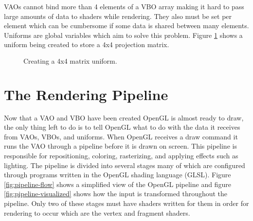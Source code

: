\documentclass{article}
\begin{document}
VAOs cannot bind more than 4 elements of a VBO array making it hard to pass large amounts of data to shaders while rendering. They also must be set per element which can be cumbersome if some data is shared between many elements. Uniforms are global variables which aim to solve this problem. Figure \ref{fig:matrix-uniform} shows a uniform being created to store a 4x4 projection matrix.

\begin{figure}[h]
	
	\caption{Creating a 4x4 matrix uniform.}
	\label{fig:matrix-uniform}
\end{figure}

\section{The Rendering Pipeline}
Now that a VAO and VBO have been created OpenGL is almost ready to draw, the only thing left to do is to tell OpenGL what to do with the data it receives from VAOs, VBOs, and uniforms. When OpenGL receives a draw command it runs the VAO through a pipeline before it is drawn on screen. This pipeline is responsible for repositioning, coloring, rasterizing, and applying effects such as lighting. The pipeline is divided into several stages many of which are configured through programs written in the OpenGL shading language (GLSL). Figure \ref{fig:pipeline-flow} shows a simplified view of the OpenGL pipeline and figure \ref{fig:pipeline-visualized} shows how the input is transformed throughout the pipeline. Only two of these stages must have shaders written for them in order for rendering to occur which are the vertex and fragment shaders.
\end{document}
